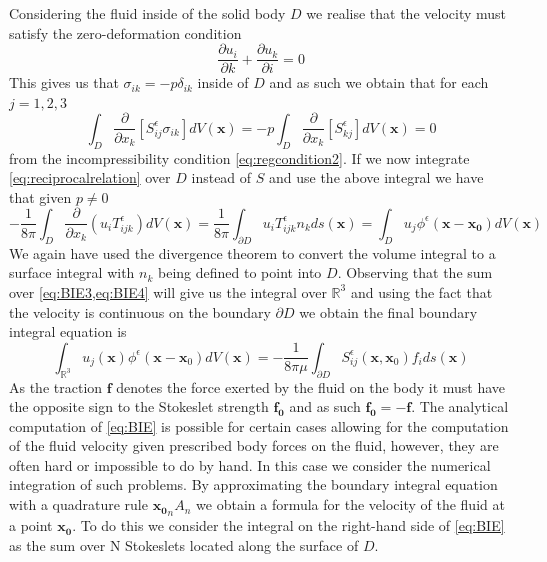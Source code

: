 Considering the fluid inside of the solid body $D$ we realise that the velocity must satisfy the zero-deformation condition
\begin{equation*}
  \frac{\partial u_i}{\partial k} + \frac{\partial u_k}{\partial i} = 0
\end{equation*}
This gives us that $\sigma_{ik} = -p\delta_{ik}$ inside of $D$ and as such we obtain that for each $j=1,2,3$
\begin{equation*}
  \int_{D} \frac{\partial}{\partial x_k}\left[S^\epsilon_{ij}\sigma_{ik}\right]dV(\mathbf{x}) = -p\int_{D} \frac{\partial}{\partial x_k}\left[S^\epsilon_{kj}\right]dV(\mathbf{x}) = 0
\end{equation*}
from the incompressibility condition \cref{eq:regcondition2}. If we now integrate \cref{eq:reciprocalrelation} over $D$ instead of $S$ and use the above integral we have that given $p \neq 0$
\begin{equation}
  \label{eq:BIE4}
-\frac{1}{8\pi}\int_{D} \frac{\partial}{\partial x_k}\left(u_iT^\epsilon_{ijk} \right) dV(\mathbf{x}) = \frac{1}{8\pi}\int_{\partial D} u_iT^\epsilon_{ijk}n_k ds(\mathbf{x}) = \int_D u_j \phi^\epsilon(\mathbf{x}-\mathbf{x_0}) dV(\mathbf{x})
\end{equation}
We again have used the divergence theorem to convert the volume integral to a surface integral with $n_k$ being defined to point into $D$. Observing that the sum over \cref{eq:BIE3,eq:BIE4} will give us the integral over $\mathbb{R}^{3}$ and using the fact that the velocity is continuous on the boundary $\partial D$ we obtain the final boundary integral equation is
\begin{equation}
  \label{eq:BIE}
    \int_{\mathbb{R}^{3}} u_{j}(\mathbf{x}) \phi^{\epsilon}\left(\mathbf{x}-\mathbf{x}_{0}\right) d V(\mathbf{x})=-\frac{1}{8 \pi \mu} \int_{\partial D} S_{i j}^{\epsilon}\left(\mathbf{x}, \mathbf{x}_{0}\right) f_{i} d s(\mathbf{x})
\end{equation}
As the traction $\mathbf{f}$ denotes the force exerted by the fluid on the body it must have the opposite sign to the Stokeslet strength $\mathbf{f_0}$ and as such $\mathbf{f_0} = -\mathbf{f}$.
The analytical computation of \cref{eq:BIE} is possible for certain cases allowing for the computation of the fluid velocity given prescribed body forces on the fluid, however, they are often hard or impossible to do by hand. In this case we consider the numerical integration of such problems. By approximating the boundary integral equation with a quadrature rule $\mathbf{x_0}_n A_n$ we obtain a formula for the velocity of the fluid at a point $\mathbf{x_0}$. To do this we consider the integral on the right-hand side of \cref{eq:BIE} as the sum over N Stokeslets located along the surface of $D$. 

